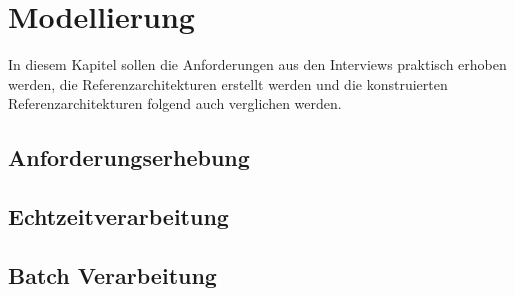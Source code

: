 \chapter{Modellierung}
In diesem Kapitel sollen die Anforderungen aus den Interviews praktisch erhoben werden, die Referenzarchitekturen erstellt werden und die konstruierten Referenzarchitekturen folgend auch verglichen werden.
\section{Anforderungserhebung}


\section{Echtzeitverarbeitung}


\section{Batch Verarbeitung}
